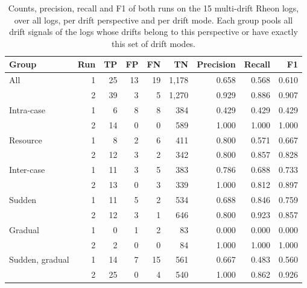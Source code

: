 \begin{table}[htbp]
	\centering
	\caption[Results on the multi-drift Rheon logs]{%
		Counts, precision, recall and F1 of both runs on the 15 multi-drift Rheon logs, over all logs, per drift perspective and per drift mode. Each group pools all drift signals of the logs whose drifts belong to this perspective or have exactly this set of drift modes.}
	\label{tab:eval:rheon:multi}
	\small
	\begin{tabular}{@{}l|r|r|r|r|r|r|r|r@{}}
		\hline
		Group & Run & TP & FP & FN & TN & Precision & Recall & F1 \\
		\hline
		All & 1 & 25 & 13 & 19 & 1,178 & 0.658 & 0.568 & 0.610 \\
		 & 2 & 39 & 3 & 5 & 1,270 & 0.929 & 0.886 & 0.907 \\
		\hline
		Intra-case & 1 & 6 & 8 & 8 & 384 & 0.429 & 0.429 & 0.429 \\
		 & 2 & 14 & 0 & 0 & 589 & 1.000 & 1.000 & 1.000 \\
		Resource & 1 & 8 & 2 & 6 & 411 & 0.800 & 0.571 & 0.667 \\
		 & 2 & 12 & 3 & 2 & 342 & 0.800 & 0.857 & 0.828 \\
		Inter-case & 1 & 11 & 3 & 5 & 383 & 0.786 & 0.688 & 0.733 \\
		 & 2 & 13 & 0 & 3 & 339 & 1.000 & 0.812 & 0.897 \\
		\hline
		Sudden & 1 & 11 & 5 & 2 & 534 & 0.688 & 0.846 & 0.759 \\
		 & 2 & 12 & 3 & 1 & 646 & 0.800 & 0.923 & 0.857 \\
		Gradual & 1 & 0 & 1 & 2 & 83 & 0.000 & 0.000 & 0.000 \\
		 & 2 & 2 & 0 & 0 & 84 & 1.000 & 1.000 & 1.000 \\
		Sudden, gradual & 1 & 14 & 7 & 15 & 561 & 0.667 & 0.483 & 0.560 \\
		 & 2 & 25 & 0 & 4 & 540 & 1.000 & 0.862 & 0.926 \\
		\hline
	\end{tabular}
\end{table}


